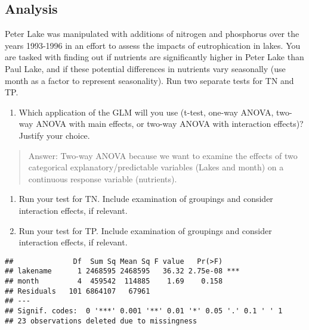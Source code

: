 \documentclass[]{article}
\newenvironment{Shaded}{\begin{snugshade}}{\end{snugshade}}
\newcommand{\KeywordTok}[1]{\textcolor[rgb]{0.13,0.29,0.53}{\textbf{#1}}}
\newcommand{\DataTypeTok}[1]{\textcolor[rgb]{0.13,0.29,0.53}{#1}}
\newcommand{\StringTok}[1]{\textcolor[rgb]{0.31,0.60,0.02}{#1}}
\newcommand{\CommentTok}[1]{\textcolor[rgb]{0.56,0.35,0.01}{\textit{#1}}}
\newcommand{\OperatorTok}[1]{\textcolor[rgb]{0.81,0.36,0.00}{\textbf{#1}}}
\newcommand{\NormalTok}[1]{#1}
\providecommand{\tightlist}{%
  \setlength{\itemsep}{0pt}\setlength{\parskip}{0pt}}
\begin{document}
\subsection{Analysis}\label{analysis}

Peter Lake was manipulated with additions of nitrogen and phosphorus
over the years 1993-1996 in an effort to assess the impacts of
eutrophication in lakes. You are tasked with finding out if nutrients
are significantly higher in Peter Lake than Paul Lake, and if these
potential differences in nutrients vary seasonally (use month as a
factor to represent seasonality). Run two separate tests for TN and TP.

\begin{enumerate}
\def\labelenumi{\arabic{enumi}.}
\setcounter{enumi}{3}
\tightlist
\item
  Which application of the GLM will you use (t-test, one-way ANOVA,
  two-way ANOVA with main effects, or two-way ANOVA with interaction
  effects)? Justify your choice.
\end{enumerate}

\begin{quote}
Answer: Two-way ANOVA because we want to examine the effects of two
categorical explanatory/predictable variables (Lakes and month) on a
continuous response variable (nutrients).
\end{quote}

\begin{enumerate}
\def\labelenumi{\arabic{enumi}.}
\setcounter{enumi}{4}
\item
  Run your test for TN. Include examination of groupings and consider
  interaction effects, if relevant.
\item
  Run your test for TP. Include examination of groupings and consider
  interaction effects, if relevant.
\end{enumerate}

\begin{Shaded}
\end{Shaded}

\begin{verbatim}
##              Df  Sum Sq Mean Sq F value   Pr(>F)    
## lakename      1 2468595 2468595   36.32 2.75e-08 ***
## month         4  459542  114885    1.69    0.158    
## Residuals   101 6864107   67961                     
## ---
## Signif. codes:  0 '***' 0.001 '**' 0.01 '*' 0.05 '.' 0.1 ' ' 1
## 23 observations deleted due to missingness
\end{verbatim}
\end{document}
